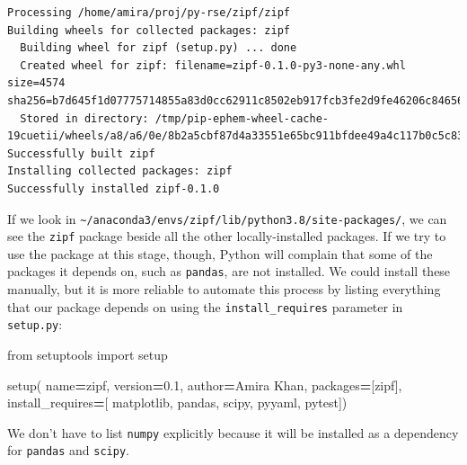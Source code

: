 \documentclass[
]{krantz}
\makeatletter
\newenvironment{Shaded}{\begin{snugshade}}{\end{snugshade}}
\newcommand{\ImportTok}[1]{#1}
\newcommand{\NormalTok}[1]{#1}
\newcommand{\OperatorTok}[1]{\textcolor[rgb]{0.81,0.36,0.00}{\textbf{#1}}}
\newcommand{\StringTok}[1]{\textcolor[rgb]{0.31,0.60,0.02}{#1}}
\newenvironment{kframe}{%
\medskip{}
\setlength{\fboxsep}{.8em}
 \def\at@end@of@kframe{}%
 \ifinner\ifhmode%
  \def\at@end@of@kframe{\end{minipage}}%
  \begin{minipage}{\columnwidth}%
 \fi\fi%
 \def\FrameCommand##1{\hskip\@totalleftmargin \hskip-\fboxsep
 \colorbox{shadecolor}{##1}\hskip-\fboxsep
     \hskip-\linewidth \hskip-\@totalleftmargin \hskip\columnwidth}%
 \MakeFramed {\advance\hsize-\width
   \@totalleftmargin\z@ \linewidth\hsize
   \@setminipage}}%
 {\par\unskip\endMakeFramed%
 \at@end@of@kframe}
\renewenvironment{Shaded}{\begin{kframe}}{\end{kframe}}
\makeatother
\begin{document}
\begin{verbatim}
Processing /home/amira/proj/py-rse/zipf/zipf
Building wheels for collected packages: zipf
  Building wheel for zipf (setup.py) ... done
  Created wheel for zipf: filename=zipf-0.1.0-py3-none-any.whl size=4574 sha256=b7d645f1d07775714855a83d0cc62911c8502eb917fcb3fe2d9fe46206c84656
  Stored in directory: /tmp/pip-ephem-wheel-cache-19cuetii/wheels/a8/a6/0e/8b2a5cbf87d4a33551e65bc911bfdee49a4c117b0c5c834a47
Successfully built zipf
Installing collected packages: zipf
Successfully installed zipf-0.1.0
\end{verbatim}

If we look in \texttt{\textasciitilde{}/anaconda3/envs/zipf/lib/python3.8/site-packages/},
we can see the \texttt{zipf} package beside all the other locally-installed packages.
If we try to use the package at this stage,
though,
Python will complain that some of the packages it depends on,
such as \texttt{pandas},
are not installed.
We could install these manually,
but it is more reliable to automate this process
by listing everything that our package depends on
using the \texttt{install\_requires} parameter in \texttt{setup.py}:

\begin{Shaded}
\begin{Highlighting}[]
\ImportTok{from}\NormalTok{ setuptools }\ImportTok{import}\NormalTok{ setup}


\NormalTok{setup(}
\NormalTok{    name}\OperatorTok{=}\StringTok{\textquotesingle{}zipf\textquotesingle{}}\NormalTok{,}
\NormalTok{    version}\OperatorTok{=}\StringTok{\textquotesingle{}0.1\textquotesingle{}}\NormalTok{,}
\NormalTok{    author}\OperatorTok{=}\StringTok{\textquotesingle{}Amira Khan\textquotesingle{}}\NormalTok{,}
\NormalTok{    packages}\OperatorTok{=}\NormalTok{[}\StringTok{\textquotesingle{}zipf\textquotesingle{}}\NormalTok{],}
\NormalTok{    install\_requires}\OperatorTok{=}\NormalTok{[}
        \StringTok{\textquotesingle{}matplotlib\textquotesingle{}}\NormalTok{,}
        \StringTok{\textquotesingle{}pandas\textquotesingle{}}\NormalTok{,}
        \StringTok{\textquotesingle{}scipy\textquotesingle{}}\NormalTok{,}
        \StringTok{\textquotesingle{}pyyaml\textquotesingle{}}\NormalTok{,}
        \StringTok{\textquotesingle{}pytest\textquotesingle{}}\NormalTok{])}
\end{Highlighting}
\end{Shaded}

We don't have to list \texttt{numpy} explicitly
because it will be installed as a dependency for \texttt{pandas} and \texttt{scipy}.
\end{document}
